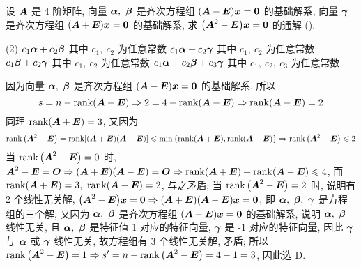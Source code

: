 \begin{example}
    设 $\vb*{A}$ 是 4 阶矩阵, 向量 $\vb*{\alpha},~\vb*{\beta}$ 是齐次方程组 $(\vb*{A}-\vb*{E})\vb*{x}=\vb*{0}$ 的基础解系, 向量 $\vb*{\gamma}$ 是齐次方程组 $(\vb*{A}+\vb*{E})\vb*{x}=\vb*{0}$ 的基础解系, 求 $\qty(\vb*{A}^2-\vb*{E})\vb*{x}=\vb*{0}$ 的通解 (\quad).
    \begin{tasks}(2)
        \task $c_1\vb*{\alpha}+c_2\vb*{\beta}$ 其中 $c_1,~c_2$ 为任意常数
        \task $c_1\vb*{\alpha}+c_2\vb*{\gamma}$ 其中 $c_1,~c_2$ 为任意常数
        \task $c_1\vb*{\beta}+c_2\vb*{\gamma}$ 其中 $c_1,~c_2$ 为任意常数
        \task $c_1\vb*{\alpha}+c_2\vb*{\beta}+c_3\vb*{\gamma}$ 其中 $c_1,~c_2,~c_3$ 为任意常数
    \end{tasks}
\end{example}
\begin{solution}
    因为向量 $\vb*{\alpha},~\vb*{\beta}$ 是齐次方程组 $(\vb*{A}-\vb*{E})\vb*{x}=\vb*{0}$ 的基础解系, 所以 $$s=n-\rank(\vb*{A}-\vb*{E})\Rightarrow 2=4-\rank(\vb*{A}-\vb*{E})\Rightarrow \rank(\vb*{A}-\vb*{E})=2$$
    同理 $\rank(\vb*{A}+\vb*{E})=3$, 又因为 
    $$\rank\qty(\vb*{A}^2-\vb*{E})=\rank[(\vb*{A}+\vb*{E})(\vb*{A}-\vb*{E})]\leqslant \min\qty{\rank(\vb*{A}+\vb*{E}),\rank(\vb*{A}-\vb*{E})}\Rightarrow \rank\qty(\vb*{A}^2-\vb*{E})\leqslant 2$$
    当 $\rank\qty(\vb*{A}^2-\vb*{E})=0$ 时, $\vb*{A}^2-\vb*{E}=\vb*{O}\Rightarrow (\vb*{A}+\vb*{E})(\vb*{A}-\vb*{E})=\vb*{O}\Rightarrow \rank(\vb*{A}+\vb*{E})+\rank(\vb*{A}-\vb*{E})\leqslant 4$, 而 $\rank(\vb*{A}+\vb*{E})=3,~\rank(\vb*{A}-\vb*{E})=2$, 与之矛盾;
    当 $\rank\qty(\vb*{A}^2-\vb*{E})=2$ 时, 说明有 2 个线性无关解, $\qty(\vb*{A}^2-\vb*{E})\vb*{x}=\vb*{0}\Rightarrow (\vb*{A}+\vb*{E})(\vb*{A}-\vb*{E})\vb*{x}=\vb*{0}$, 即 $\vb*{\alpha},~\vb*{\beta},~\vb*{\gamma}$ 是方程组的三个解, 
    又因为 $\vb*{\alpha},~\vb*{\beta}$ 是齐次方程组 $(\vb*{A}-\vb*{E})\vb*{x}=\vb*{0}$ 的基础解系, 说明 $\vb*{\alpha},~\vb*{\beta}$ 线性无关, 且 $\vb*{\alpha},~\vb*{\beta}$ 是特征值 1 对应的特征向量, $\vb*{\gamma}$ 是 -1 对应的特征向量, 因此 $\vb*{\gamma}$ 与 $\vb*{\alpha}$ 或 $\vb*{\gamma}$ 线性无关, 故方程组有 3 个线性无关解, 矛盾;
    所以 $\rank\qty(\vb*{A}^2-\vb*{E})=1\Rightarrow s'=n-\rank\qty(\vb*{A}^2-\vb*{E})=4-1=3$, 因此选 D.
\end{solution}


